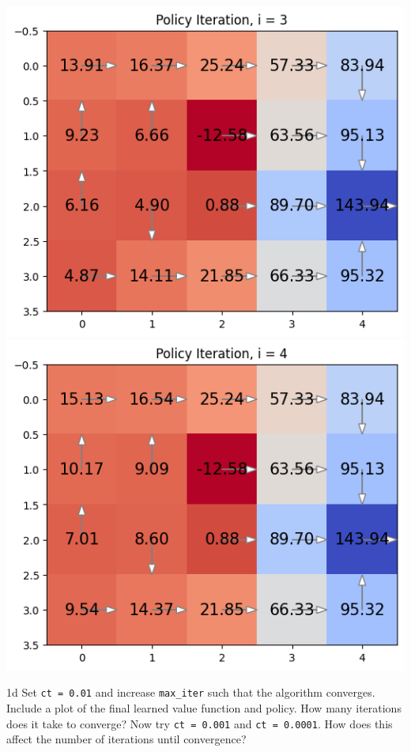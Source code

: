 \documentclass[expanded]{lkx_pset}
\begin{document}
\begin{solution}
\begin{center}
		\includegraphics[scale=0.5]{figures/1c-3.png}
		\includegraphics[scale=0.5]{figures/1c-4.png}
	\end{center}

	\begin{part}{1d} Set \texttt{ct = 0.01} and increase \texttt{max\_iter} such that the algorithm converges. Include a plot of the final learned value function and policy. How many iterations does it take to converge? Now try \texttt{ct = 0.001} and \texttt{ct = 0.0001}. How does this affect the number of iterations until convergence?
	\end{part}


\end{solution}
\end{document}
